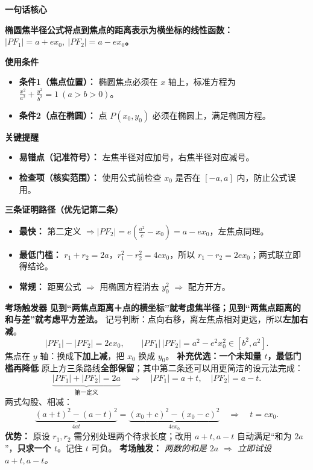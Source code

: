 \clearpage
\begin{summarybox}
	\textbf{\textcolor{CSummary}{一句话核心}}

	\textbf{椭圆焦半径公式将点到焦点的距离表示为横坐标的线性函数：$|PF_1|=a+ex_0,\ |PF_2|=a-ex_0$。}

	\medskip
	\textbf{\textcolor{CSummary}{使用条件}}
	\begin{itemize}[leftmargin=*, itemsep=0.5em, topsep=0.4em]
		\item \textbf{条件1（焦点位置）：} 椭圆焦点必须在 $x$ 轴上，标准方程为 $\frac{x^2}{a^2}+\frac{y^2}{b^2}=1\ (a>b>0)$。
		\item \textbf{条件2（点在椭圆）：} 点 $P(x_0,y_0)$ 必须在椭圆上，满足椭圆方程。
	\end{itemize}

	\medskip
	\textbf{\textcolor{CSummary}{关键提醒}}
	\begin{itemize}[leftmargin=*, itemsep=0.5em, topsep=0.4em]
		\item \textbf{易错点（记准符号）：} 左焦半径对应加号，右焦半径对应减号。
		\item \textbf{检查项（核实范围）：} 使用公式前检查 $x_0$ 是否在 $[-a,a]$ 内，防止公式误用。
	\end{itemize}


\medskip
\textbf{\textcolor{CSummary}{三条证明路径（优先记第二条）}}
\begin{itemize}[leftmargin=*, itemsep=0.35em, topsep=0.3em]
 \item \textbf{最快：} 第二定义 $\Rightarrow |PF_2|=e(\frac{a^2}{c}-x_0)=a-ex_0$，左焦点同理。
 \item \textbf{最低门槛：} $r_1+r_2=2a$，$r_1^2-r_2^2=4cx_0$，所以 $r_1-r_2=2ex_0$；两式联立即得结论。
 \item \textbf{常规：} 距离公式 $\Rightarrow$ 用椭圆方程消去 $y_0^2$ $\Rightarrow$ 配方开方。
\end{itemize}

\medskip
\textbf{\textcolor{CSummary}{考场触发器}}
\textbf{见到“两焦点距离＋点的横坐标”就考虑焦半径；见到“两焦点距离的和与差”就考虑平方差法。}
记号判断：点向右移，离左焦点相对更远，所以\textbf{左加右减}。
\[
 \boxed{|PF_1|-|PF_2|=2ex_0},\qquad
 \boxed{|PF_1|\,|PF_2|=a^2-e^2x_0^2\in[b^2,a^2]}.
\]
焦点在 $y$ 轴：换成\textbf{下加上减}，把 $x_0$ 换成 $y_0$。
\medskip
\textbf{\textcolor{CSummary}{补充优选：一个未知量 $t$，最低门槛再降低}}
原上方三条路线\textbf{全部保留}；其中第二条还可以用更简洁的设元法完成：
\[
 \underbrace{|PF_1|+|PF_2|=2a}_{\text{第一定义}}
 \quad\Longrightarrow\quad
 \boxed{|PF_1|=a+t,\quad |PF_2|=a-t}.
\]
两式勾股、相减：
\[
 \underbrace{(a+t)^2-(a-t)^2}_{4at}
 =\underbrace{(x_0+c)^2-(x_0-c)^2}_{4cx_0}
 \quad\Longrightarrow\quad \boxed{t=ex_0}.
\]
\textbf{优势：} 原设 $r_1,r_2$ 需分别处理两个待求长度；改用 $a+t,a-t$
自动满足“和为 $2a$”，\textbf{只求一个 $t$}。记住 $t$ 可负。
\textbf{考场触发：} \emph{两数的和是 $2a$ $\Rightarrow$ 立即试设 $a+t,a-t$。}
\end{summarybox}
